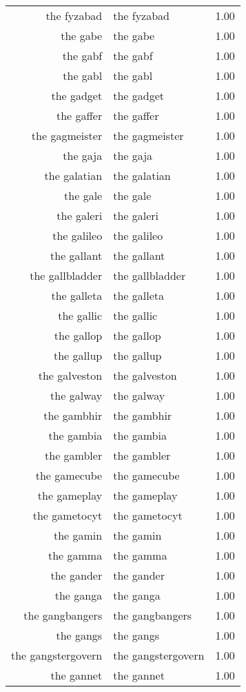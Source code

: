 \begin{table}[ht]
\begin{tabular}{rlr}
  the fyzabad & the fyzabad & 1.00 \\ 
  the gabe & the gabe & 1.00 \\ 
  the gabf & the gabf & 1.00 \\ 
  the gabl & the gabl & 1.00 \\ 
  the gadget & the gadget & 1.00 \\ 
  the gaffer & the gaffer & 1.00 \\ 
  the gagmeister & the gagmeister & 1.00 \\ 
  the gaja & the gaja & 1.00 \\ 
  the galatian & the galatian & 1.00 \\ 
  the gale & the gale & 1.00 \\ 
  the galeri & the galeri & 1.00 \\ 
  the galileo & the galileo & 1.00 \\ 
  the gallant & the gallant & 1.00 \\ 
  the gallbladder & the gallbladder & 1.00 \\ 
  the galleta & the galleta & 1.00 \\ 
  the gallic & the gallic & 1.00 \\ 
  the gallop & the gallop & 1.00 \\ 
  the gallup & the gallup & 1.00 \\ 
  the galveston & the galveston & 1.00 \\ 
  the galway & the galway & 1.00 \\ 
  the gambhir & the gambhir & 1.00 \\ 
  the gambia & the gambia & 1.00 \\ 
  the gambler & the gambler & 1.00 \\ 
  the gamecube & the gamecube & 1.00 \\ 
  the gameplay & the gameplay & 1.00 \\ 
  the gametocyt & the gametocyt & 1.00 \\ 
  the gamin & the gamin & 1.00 \\ 
  the gamma & the gamma & 1.00 \\ 
  the gander & the gander & 1.00 \\ 
  the ganga & the ganga & 1.00 \\ 
  the gangbangers & the gangbangers & 1.00 \\ 
  the gangs & the gangs & 1.00 \\ 
  the gangstergovern & the gangstergovern & 1.00 \\ 
  the gannet & the gannet & 1.00 \\ 

\end{tabular}
\end{table}

